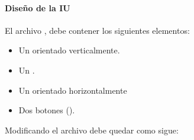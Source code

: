 \paragraph{Diseño de la IU}
\label{\detokenize{dev_docs:diseno-de-la-iu}}
El archivo , debe contener los siguientes elementos:
\begin{itemize}
\item {} 
Un  orientado verticalmente.

\item {} 
Un .

\item {} 
Un  orientado horizontalmente

\item {} 
Dos botones ().

\end{itemize}

Modificando el archivo debe quedar como sigue:

